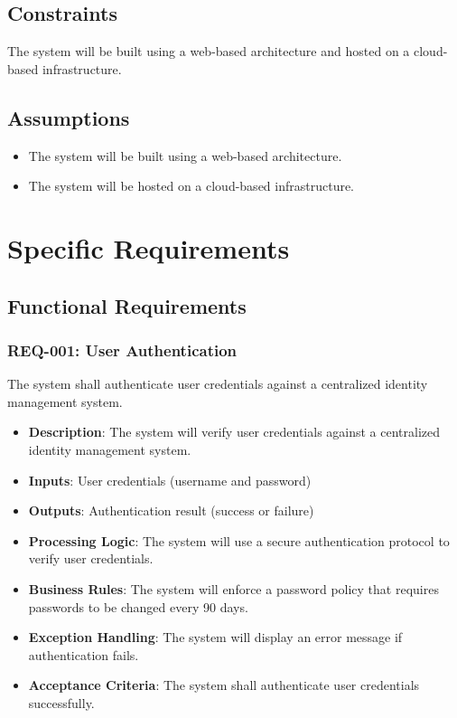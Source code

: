 \documentclass{article}
\begin{document}
\subsection{Constraints}
The system will be built using a web-based architecture and hosted on a cloud-based infrastructure.

\subsection{Assumptions}
\begin{itemize}
\item The system will be built using a web-based architecture.
\item The system will be hosted on a cloud-based infrastructure.
\end{itemize}

\section{Specific Requirements}

\subsection{Functional Requirements}

\subsubsection{REQ-001: User Authentication}
The system shall authenticate user credentials against a centralized identity management system.

\begin{itemize}
\item \textbf{Description}: The system will verify user credentials against a centralized identity management system.
\item \textbf{Inputs}: User credentials (username and password)
\item \textbf{Outputs}: Authentication result (success or failure)
\item \textbf{Processing Logic}: The system will use a secure authentication protocol to verify user credentials.
\item \textbf{Business Rules}: The system will enforce a password policy that requires passwords to be changed every 90 days.
\item \textbf{Exception Handling}: The system will display an error message if authentication fails.
\item \textbf{Acceptance Criteria}: The system shall authenticate user credentials successfully.
\end{itemize}
\end{document}
